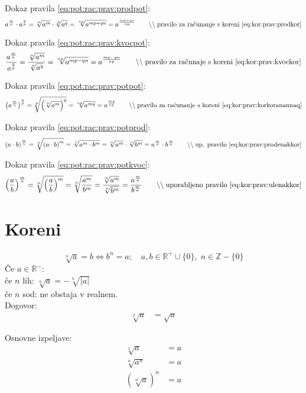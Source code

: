 \documentclass[a4paper,oneside,12pt,fleqn]{article}
\def\R{\ensuremath{\mathbb R}}
\def\Z{\ensuremath{\mathbb Z}}
\newcommand\krat\cdot
\newcommand{\comment}[1]{\ensuremath{\qquad\backslash\backslash\;}\textnormal{#1}}
\renewcommand\iff\Leftrightarrow
\numberwithin{equation}{section}
\begin{document}
Dokaz pravila \ref{eq:pot:rac:prav:prodpot}:
\[ a^{\frac{m}{n}} \krat a^{\frac{q}{p}} = \sqrt[n]{a^m} \krat \sqrt[p]{a^q} =
\sqrt[np]{a^{mp+qn}} = a^{\frac{mp+qn}{np}} \comment{pravilo za računanje s
koreni \eqref{eq:kor:prav:prodkor}} \]

Dokaz pravila \ref{eq:pot:rac:prav:kvocpot}:
\[ \frac{a^{\frac{m}{n}}}{a^{\frac{q}{p}}} = \frac{\sqrt[n]{a^m}}{\sqrt[p]{a^q}} =
\sqrt[np]{a^{mp-qn}} = a^{\frac{mp-qn}{np}} \comment{pravilo za računaje s koreni
\eqref{eq:kor:prav:kvockor}} \]

Dokaz pravila \ref{eq:pot:rac:prav:potpot}:
\[ \left( a^{\frac{m}{n}} \right)^{\frac{q}{p}} = \sqrt[p]{\left(\sqrt[n]{a^m} \right)^q}
= \sqrt[np]{a^{mq}} = a^{\frac{mq}{np}} \comment{pravilo za računanje s koreni
\eqref{eq:kor:prav:korkoranannaq}}\]

Dokaz pravila \ref{eq:pot:rac:prav:potprod}:
\[ \left( a \krat b \right)^{\frac{m}{n}} = \sqrt[n]{\left( a \krat b\right)^m} =
\sqrt[n]{a^m \krat b^m} = \sqrt[n]{a^m} \krat \sqrt[n]{b^m} = a^{\frac{m}{n}} \krat
b^{\frac{m}{n}} \comment{up. pravilo \eqref{eq:kor:prav:prodenakkor}} \]

Dokaz pravila \ref{eq:pot:rac:prav:potkvoc}:
\[ \left( \frac{a}{b} \right)^{\frac{m}{n}} = \sqrt[n]{\left( \frac{a}{b} \right)^m} =
\sqrt[n]{\frac{a^m}{b^m}} = \frac{\sqrt[n]{a^m}}{\sqrt[n]{b^m}} =
\frac{a^{\frac{m}{n}}}{b^{\frac{m}{n}}} \comment{uporabljeno pravilo \eqref{eq:kor:prav:ulenakkor}}
\]
\section{Koreni}
\label{sec:kor}
\begin{equation}
  \label{eq:kor:def}
  \sqrt[n]{a} = b \iff b^n = a; \quad a, b \in \R^+ \cup \{0\}, \; n \in \Z - \{0\}
\end{equation}
Če $a \in \R^-$: \\
če $n$ lih: $\sqrt[n]{a} = -\sqrt[n]{|a|}$ \\
če $n$ sod: ne obstaja v realnem.\\

Dogovor:
\begin{align*}
  \sqrt[2]{a} &= \sqrt{a}
\end{align*}

Osnovne izpeljave:
\begin{align}
  \sqrt[1]{a} &= a \nonumber \\
  \sqrt[n]{a^n} &= a \label{eq:kor:dog:nkorn} \\
  \left(\sqrt[n]{a}\right)^n &= a \label{eq:kor:dog:nkornzakn}
\end{align}
\end{document}

